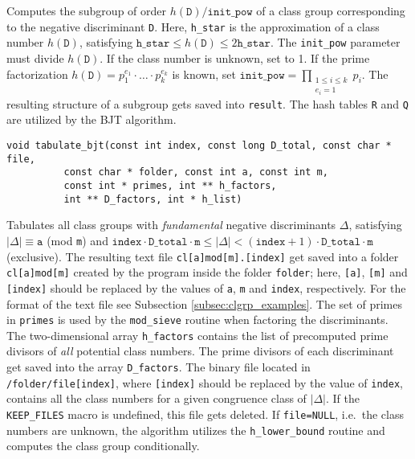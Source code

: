 \documentclass[a4paper,10pt]{article}
\newcommand{\code}{\lstinline}
\begin{document}
Computes the subgroup of order $h(\texttt{D})/\texttt{init\_pow}$ of a class group corresponding to the negative discriminant \code{D}. Here, \code{h_star} is the approximation of a class number $h(\texttt{D})$, satisfying \mbox{$\texttt{h\_star} \leq h(\texttt{D}) \leq 2\texttt{h\_star}$}. The \code{init_pow} parameter must divide $h(\texttt{D})$. If the class number is unknown, set to 1. If the prime factorization $h(\texttt{D})=p_1^{e_1}\cdot\ldots\cdot p_k^{e_k}$ is known, set $\texttt{init\_pow} = \prod\limits_{\substack{1 \leq i \leq k\\e_i=1}}p_i$. The resulting structure of a subgroup gets saved into \code{result}. The hash tables \code{R} and \code{Q} are utilized by the BJT algorithm.

\begin{lstlisting}
void tabulate_bjt(const int index, const long D_total, const char * file,
		  const char * folder, const int a, const int m,
		  const int * primes, int ** h_factors,
		  int ** D_factors, int * h_list)
\end{lstlisting}

Tabulates all class groups with \emph{fundamental} negative discriminants $\Delta$, satisfying $|\Delta| \equiv \texttt{a}$ (mod \code{m}) and $\texttt{index} \cdot \texttt{D\_total} \cdot \texttt{m} \leq |\Delta| < (\texttt{index} + 1) \cdot \texttt{D\_total} \cdot \texttt{m}$ (exclusive). The resulting text file \code{cl[a]mod[m].[index]} get saved into a folder \code{cl[a]mod[m]} created by the program inside the folder \code{folder}; here, \code{[a]}, \code{[m]} and \code{[index]} should be replaced by the values of \code{a}, \code{m} and \code{index}, respectively. For the format of the text file see Subsection \ref{subsec:clgrp_examples}.  The set of primes in \code{primes} is used by the \code{mod_sieve} routine when factoring the discriminants. The two-dimensional array \code{h_factors} contains the list of precomputed prime divisors of \emph{all} potential class numbers. The prime divisors of each discriminant get saved into the array \code{D_factors}. The binary file located in \code{/folder/file[index]}, where \code{[index]} should be replaced by the value of \code{index}, contains all the class numbers for a given congruence class of $|\Delta|$. If the \code{KEEP_FILES} macro is undefined, this file gets deleted. If \code{file=NULL}, i.e.\ the class numbers are unknown, the algorithm utilizes the \code{h_lower_bound} routine and computes the class group conditionally.
\end{document}
